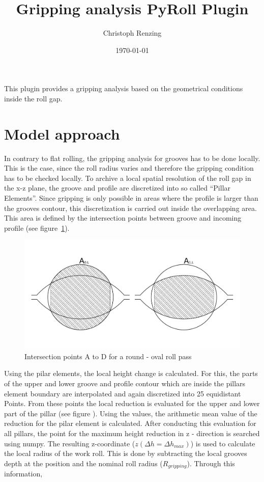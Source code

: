 \documentclass[11pt]{PyRollDocs}
\begin{document}
    \title{Gripping analysis PyRoll Plugin}
    \author{Christoph Renzing}
    \date{\today}

    \maketitle

    This plugin provides a gripping analysis based on the geometrical conditions inside the roll gap.


    \section{Model approach}\label{sec:model-approach}

    In contrary to flat rolling, the gripping analysis for grooves has to be done locally.
    This is the case, since the roll radius varies and therefore the gripping condition has to be checked locally.
    To archive a local spatial resolution of the roll gap in the x-z plane, the groove and profile are discretized into so called \enquote{Pillar Elements}.
    Since gripping is only possible in areas where the profile is larger than the grooves contour, this discretization is carried out inside the overlapping area.
    This area is defined by the intersection points between groove and incoming profile (see figure~\ref{fig:overlapping-intersection-points}).

    \begin{figure}
        \centering
        \includegraphics[width=.7\linewidth]{img/overlapping-area}
        \caption{Intersection points A to D for a round - oval roll pass}
        \label{fig:overlapping-intersection-points}
    \end{figure}

    Using the pilar elements, the local height change is calculated.
    For this, the  parts of the upper and lower groove and profile contour which are inside the pillars element boundary are interpolated and
    again discretized into 25 equidistant Points.
    From these points the local reduction is evaluated for the upper and lower part of the pillar (see figure ).
    Using the values, the arithmetic mean value of the reduction for the pilar element is calculated.
    After conducting this evaluation for all pillars, the point for the maximum height reduction in z - direction is searched using numpy.
    The resulting z-coordinate ($z(\Delta h = \Delta h_{max})$) is used to calculate the local radius of the work roll.
    This is done by subtracting the local grooves depth at the position and the nominal roll radius ($R_{gripping}$).
    Through this information,
\end{document}
